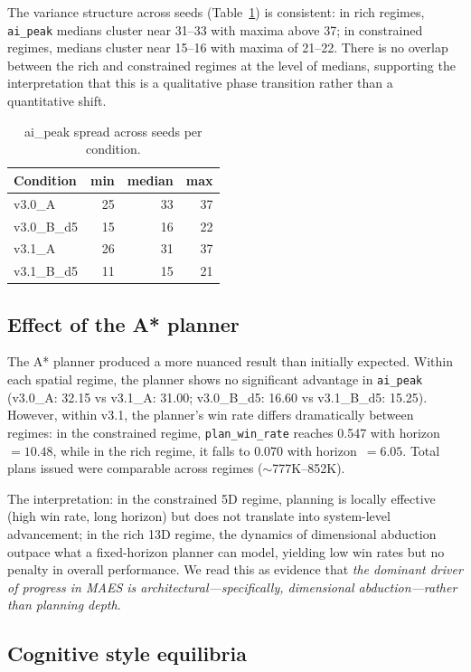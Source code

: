 \documentclass[11pt,a4paper]{article}
\begin{document}
The variance structure across seeds (Table~\ref{tab:spread}) is consistent:
in rich regimes, \texttt{ai\_peak} medians cluster near 31--33 with maxima
above 37; in constrained regimes, medians cluster near 15--16 with maxima
of 21--22. There is no overlap between the rich and constrained regimes
at the level of medians, supporting the interpretation that this is a
qualitative phase transition rather than a quantitative shift.

\begin{table}[h]
\centering
\caption{ai\_peak spread across seeds per condition.}
\label{tab:spread}
\small
\begin{tabular}{lrrr}
\toprule
Condition & min & median & max \\
\midrule
v3.0\_A     & 25 & 33 & 37 \\
v3.0\_B\_d5 & 15 & 16 & 22 \\
v3.1\_A     & 26 & 31 & 37 \\
v3.1\_B\_d5 & 11 & 15 & 21 \\
\bottomrule
\end{tabular}
\end{table}

\subsection{Effect of the A* planner}

The A* planner produced a more nuanced result than initially expected.
Within each spatial regime, the planner shows no significant advantage in
\texttt{ai\_peak} (v3.0\_A: 32.15 vs v3.1\_A: 31.00; v3.0\_B\_d5: 16.60 vs
v3.1\_B\_d5: 15.25). However, within v3.1, the planner's win rate differs
dramatically between regimes: in the constrained regime,
\texttt{plan\_win\_rate} reaches 0.547 with horizon~$=10.48$, while in the
rich regime, it falls to 0.070 with horizon~$=6.05$. Total plans issued
were comparable across regimes ($\sim$777K--852K).

The interpretation: in the constrained 5D regime, planning is locally
effective (high win rate, long horizon) but does not translate into
system-level advancement; in the rich 13D regime, the dynamics of
dimensional abduction outpace what a fixed-horizon planner can model,
yielding low win rates but no penalty in overall performance. We read
this as evidence that \emph{the dominant driver of progress in MAES is
architectural---specifically, dimensional abduction---rather than
planning depth}.

\subsection{Cognitive style equilibria}
\end{document}

